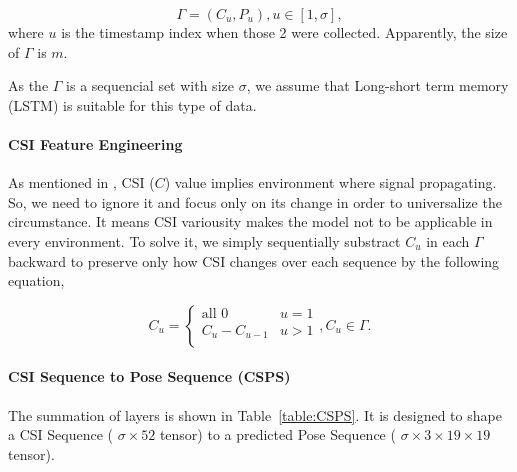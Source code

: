 \documentclass[10pt,letterpaper]{article}
\begin{document}
	\begin{equation}
	\Gamma =  {(C_u, P_u), u \in [1, \sigma]},
	\label{eq:SubDataset}
	\end{equation}
	where $u$ is the timestamp index when those 2 were collected. Apparently, the size of $\Gamma$ is $m$.
	
	
	As the $\Gamma$ is a sequencial set with size $\sigma$, we assume that Long-short term memory (LSTM) \cite{hochreiterS} is suitable for this type of data.
	

	
	\paragraph*{CSI Feature Engineering}
	As mentioned in , CSI ($C$) value implies environment where signal propagating. So, we need to ignore it and focus only on its change in order to universalize the circumstance. It means CSI variousity makes the model not to be applicable in every environment. To solve it, we simply sequentially substract $C_u$  in each $\Gamma$ backward to preserve only how CSI changes over each sequence by the following equation,
	
	
	\begin{equation}
	C_u =  \begin{cases}
	\text{all } 0 &\text{$u = 1$}\\
	C_u - C_{u-1} &\text{$u > 1 $}\\
	\end{cases}, C_u \in \Gamma.
	\label{eq:CSIFeatureEn}
	\end{equation}
	
	
	
	\paragraph*{CSI Sequence to Pose Sequence (CSPS)}
	
	The summation of layers is shown in Table~\ref{table:CSPS}.
	It is designed to shape a CSI Sequence ( $\sigma \times 52$ tensor) to a predicted Pose Sequence ( $\sigma \times 3\times 19\times 19$ tensor).
	
\end{document}
